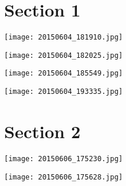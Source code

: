 \documentclass[11pt,landscape]{article}
\begin{document}
\clearpage
\tableofcontents

\section{Section 1}
\begin{center}
\texttt{[image: 20150604\_181910.jpg]}
\end{center}
\begin{center}
\texttt{[image: 20150604\_182025.jpg]}
\end{center}
\begin{center}
\texttt{[image: 20150604\_185549.jpg]}
\end{center}
\begin{center}
\texttt{[image: 20150604\_193335.jpg]}
\end{center}

\section{Section 2}
\begin{center}
\texttt{[image: 20150606\_175230.jpg]}
\end{center}
\begin{center}
\texttt{[image: 20150606\_175628.jpg]}
\end{center}
\end{document}
